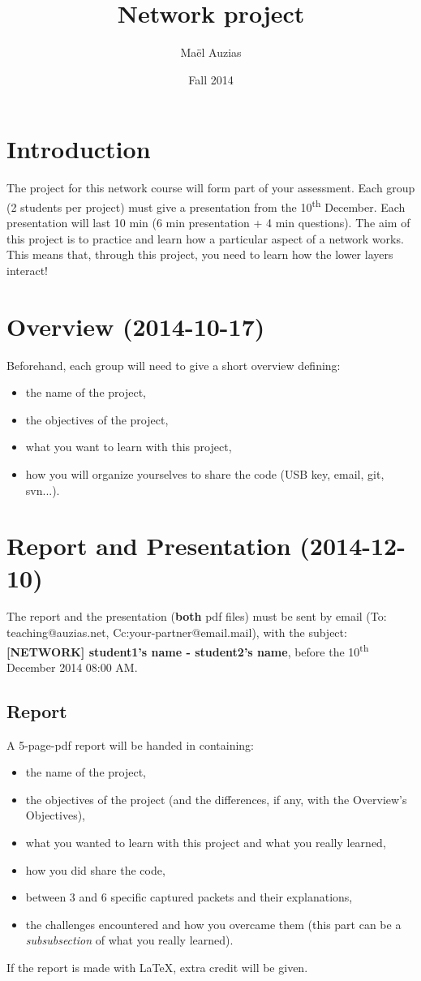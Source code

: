 \documentclass[11pt]{article}
\begin{document}
 
\title{Network project}
\date{Fall 2014}
\author{Maël Auzias}
\maketitle

\section{Introduction}
The project for this network course will form part of your assessment. Each group (2 students per project) must give a presentation from the 10\textsuperscript{th} December. Each presentation will last 10 min (6 min presentation + 4 min questions).
The aim of this project is to practice and learn how a particular aspect of a network works. This means that, through this project, you need to learn how the lower layers interact!

\section{Overview (2014-10-17)}
Beforehand, each group will need to give a short overview defining:
  \begin{itemize}
    \item the name of the project,
    \item the objectives of the project,
    \item what you want to learn with this project,
    \item how you will organize yourselves to share the code (USB key, email, git, svn...).
  \end{itemize}

\section{Report and Presentation (2014-12-10)}
The report and the presentation (\textbf{both} pdf files) must be sent by email (To: teaching@auzias.net, Cc:your-partner@email.mail), with the subject: \textbf{[NETWORK] student1's name - student2's name}, before the 10\textsuperscript{th} December 2014 08:00 AM.
\subsection{Report}
A 5-page-pdf report will be handed in containing:
  \begin{itemize}
    \item the name of the project,
    \item the objectives of the project (and the differences, if any, with the Overview's Objectives),
    \item what you wanted to learn with this project and what you really learned,
    \item how you did share the code,
    \item between 3 and 6 specific captured packets and their explanations,
    \item the challenges encountered and how you overcame them (this part can be a \emph{subsubsection} of what you really learned).
  \end{itemize}
If the report is made with \LaTeX, extra credit will be given.
\end{document}
